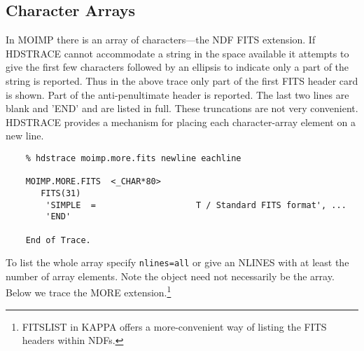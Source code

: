 \subsection{Character Arrays}

In MOIMP there is an array of characters---the NDF FITS extension. If
{\footnotesize HDSTRACE} cannot accommodate a string in the space
available it attempts to give the first few characters followed by an
ellipsis to indicate only a part of the string is reported.  Thus in the
above trace only part of the first FITS header card is shown.  Part of
the anti-penultimate header is reported.  The last two lines are blank
and 'END' and are listed in full.  These truncations are not very
convenient. {\footnotesize HDSTRACE} provides a mechanism for placing
each character-array element on a new line.

\small
\begin{verbatim}
    % hdstrace moimp.more.fits newline eachline

    MOIMP.MORE.FITS  <_CHAR*80>
       FITS(31)
        'SIMPLE  =                    T / Standard FITS format', ...
        'END'

    End of Trace.
\end{verbatim}
\normalsize
To list the whole array specify {\tt nlines=all} or give an NLINES with at
least the number of array elements.  Note the object need not
necessarily be the array.  Below we trace the MORE extension.\footnote{
FITSLIST in {\footnotesize KAPPA} offers a more-convenient way of listing the
FITS headers within NDFs.}

